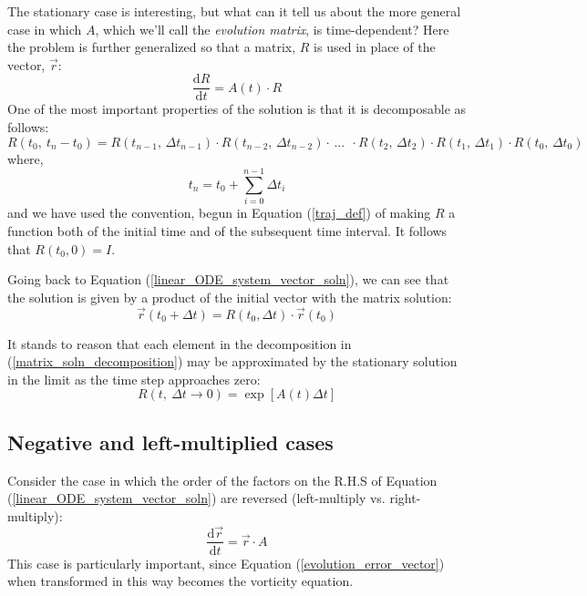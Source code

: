 \documentclass[11pt]{article}
\begin{document}
The stationary case is interesting, but what can it tell us about the 
more general case in which $A$, which we'll call the {\it evolution matrix},
is time-dependent?
Here the problem is further generalized so that a matrix, $R$ 
is used in place of the vector, $\vec r$:
\begin{equation}
\frac{\mathrm d R}{\mathrm d t}=A(t) \cdot R
\label{linear_ODE_system_matrix_soln}
\end{equation}
One of the most important properties of the solution is that it
is decomposable as follows:
\begin{equation}
R(t_0,~t_n-t_0) = R(t_{n-1},\,\Delta t_{n-1}) \cdot R(t_{n-2},\,\Delta t_{n-2}) \cdot \, ...~~ 
	\cdot R(t_2,\, \Delta t_2) \cdot R(t_1,\,\Delta t_1) \cdot R(t_0,\,\Delta t_0)
\label{matrix_soln_decomposition}
\end{equation}
where,
\begin{equation}
t_n=t_0+\sum_{i=0}^{n-1} \Delta t_i
\end{equation}
and we have used the convention, begun
in Equation (\ref{traj_def}) of making $R$ a function both of the
initial time and of the subsequent time interval.  It follows that $R(t_0, 0)=I$.

Going back to Equation (\ref{linear_ODE_system_vector_soln}), we can
see that the solution is given by a product of the initial vector with
the matrix solution:
\begin{equation}
\vec r(t_0+\Delta t)=R(t_0, \Delta t) \cdot \vec r(t_0)
\end{equation}

It stands to reason that each element in the decomposition in (\ref{matrix_soln_decomposition})
may be approximated by the stationary solution in the limit as the time step
approaches zero:
\begin{equation}
R(t, ~ \Delta t \rightarrow 0) = \exp \left [ A(t) \Delta t \right ]
\end{equation}

\subsection{Negative and left-multiplied cases}

Consider the case in which the order of the factors on the R.H.S of Equation 
(\ref{linear_ODE_system_vector_soln}) are reversed (left-multiply vs. right-multiply):
\begin{equation}
\frac{\mathrm d \vec r}{\mathrm d t} = \vec r \cdot A
\end{equation}
This case is particularly important, since Equation (\ref{evolution_error_vector})
when transformed in this way becomes the vorticity equation.
\end{document}
